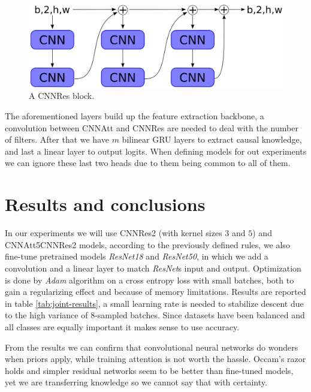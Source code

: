 \documentclass{article}
\begin{document}
\begin{figure}
    \centering
    \includegraphics[scale=.25]{images/cnn_res.png}
    \caption{A CNNRes block.}
    \label{fig:cnnres}
\end{figure}

The aforementioned layers build up the feature extraction backbone, a convolution between CNNAtt and CNNRes are needed to deal with the number of filters.
After that we have $m$ bilinear GRU layers to extract causal knowledge, and last a linear layer to output logits.
When defining models for out experiments we can ignore these last two heads due to them being common to all of them.

\section{Results and conclusions}
In our experiments we will use CNNRes2 (with kernel sizes $3$ and $5$) and CNNAtt5CNNRes2 models, according to the previously defined rules, we also fine-tune pretrained models \textit{ResNet18} and \textit{ResNet50}, in which we add a convolution and a linear layer to match \textit{ResNet}s input and output.
Optimization is done by \textit{Adam} algorithm on a cross entropy loss with small batches, both to gain a regularizing effect and because of memory limitations.
Results are reported in table \ref{tab:joint-results}, a small learning rate is needed to stabilize descent due to the high variance of 8-sampled batches.
Since datasets have been balanced and all classes are equally important it makes sense to use accuracy.

From the results we can confirm that convolutional neural networks do wonders when priors apply, while training attention is not worth the hassle. 
Occam's razor holds and simpler residual networks seem to be better than fine-tuned models, yet we are transferring knowledge so we cannot say that with certainty. 
\end{document}
